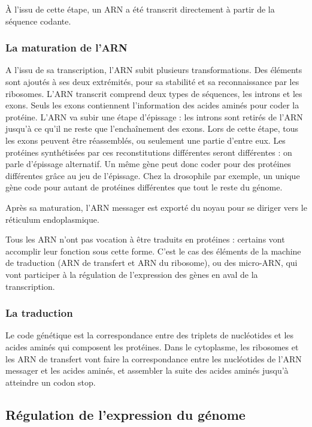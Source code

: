 \documentclass{report}
\begin{document}
À l'issu de cette étape, un ARN a été transcrit directement à partir de la séquence codante. 

\subsubsection{La maturation de l'ARN}

A l'issu de sa transcription, l'ARN subit plusieurs transformations. Des éléments sont ajoutés à ses deux extrémités, pour sa stabilité et sa reconnaissance par les ribosomes. 
L'ARN transcrit comprend deux types de séquences, les introns et les exons. Seuls les exons contiennent l'information des acides aminés pour coder la protéine. 
L'ARN va subir une étape d'épissage : les introns sont retirés de l'ARN jusqu'à ce qu'il ne reste que l'enchaînement des exons. Lors de cette étape, tous les exons peuvent être réassemblés, ou seulement une partie d'entre eux. Les protéines synthétisées par ces reconstitutions différentes seront différentes : on parle d'épissage alternatif. 
Un même gène peut donc coder pour des protéines différentes grâce au jeu de l'épissage. Chez la drosophile par exemple, un unique gène code pour autant de protéines différentes que tout le reste du génome. 

Après sa maturation, l'ARN messager est exporté du noyau pour se diriger vers le réticulum endoplasmique.

Tous les ARN n'ont pas vocation à être traduits en protéines : certains vont accomplir leur fonction sous cette forme. C'est le cas des éléments de la machine de traduction (ARN de transfert et ARN du ribosome), ou des micro-ARN, qui vont participer à la régulation de l'expression des gènes en aval de la transcription.

\subsubsection{La traduction}

Le code génétique est la correspondance entre des triplets de nucléotides et les acides aminés qui composent les protéines. 
Dans le cytoplasme, les ribosomes et les ARN de transfert vont faire la correspondance entre les nucléotides de l'ARN messager et les acides aminés, et assembler la suite des acides aminés jusqu'à atteindre un codon stop. 


\subsection{Régulation de l'expression du génome}
\end{document}
